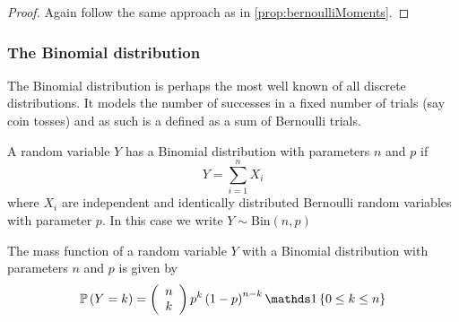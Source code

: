 \begin{proof}
Again follow the same approach as in \ref{prop:bernoulliMoments}.
\end{proof}

\subsubsection{The Binomial distribution\label{subsec:binomialDistribution}}

The Binomial distribution is perhaps the most well known of all discrete
distributions. It models the number of successes in a fixed number
of trials (say coin tosses) and as such is a defined as a sum of Bernoulli
trials.
\begin{defn}
\label{def:binomialDistribution}A random variable $Y$ has a Binomial
distribution with parameters $n$ and $p$ if 
\[
Y=\sum_{i=1}^{n}X_{i}
\]
where $X_{i}$ are independent and identically distributed Bernoulli
random variables with parameter $p$. In this case we write $Y\sim\textrm{Bin}\left(n,p\right)$
\end{defn}

\begin{prop}
\label{prop:binomialCDF}The mass function of a random variable $Y$
with a Binomial distribution with parameters $n$ and $p$ is given
by
\[
\P\left(Y=k\right)=\left(\begin{array}{c}
n\\
k
\end{array}\right)p^{k}\left(1-p\right)^{n-k}\indicate\left\{ 0\leq k\leq n\right\} 
\]
\end{prop}

